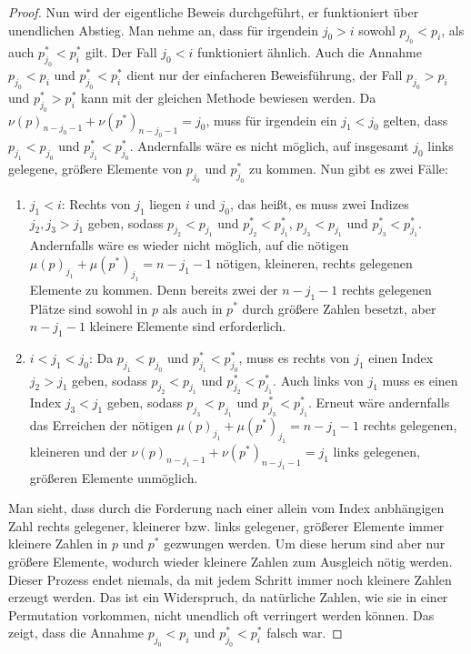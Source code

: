 \documentclass[a4paper, 11pt, ngerman]{article}
\begin{document}
\begin{proof}
    Nun wird der eigentliche Beweis durchgeführt, er funktioniert über unendlichen Abstieg. Man nehme an, dass für irgendein $j_0 > i$ sowohl $p_{j_0} < p_i$, als auch $p^*_{j_0} < p^*_i$ gilt. Der Fall $j_0 < i$ funktioniert ähnlich. Auch die Annahme $p_{j_0} < p_i$ und $p^*_{j_0} < p^*_i$ dient nur der einfacheren Beweisführung, der Fall $p_{j_0} > p_i$ und $p^*_{j_0} > p^*_i$ kann mit der gleichen Methode bewiesen werden. Da $\nu(p)_{n - j_0 - 1} + \nu(p^*)_{n - j_0 - 1} = j_0$, muss für irgendein ein $j_1 < j_0$ gelten, dass $p_{j_1} < p_{j_0}$ und $p^*_{j_1} < p^*_{j_0}$. Andernfalls wäre es nicht möglich, auf insgesamt $j_0$ links gelegene, größere Elemente von $p_{j_0}$ und $p^*_{j_0}$ zu kommen. Nun gibt es zwei Fälle:
    \begin{enumerate}
        \item $j_1 < i$: Rechts von $j_1$ liegen $i$ und $j_0$, das heißt, es muss zwei Indizes $j_2, j_3 > j_1$ geben, sodass $p_{j_2} < p_{j_1}$ und $p^*_{j_2} < p^*_{j_1}$, $p_{j_3} < p_{j_1}$ und $p^*_{j_3} < p^*_{j_1}$. Andernfalls wäre es wieder nicht möglich, auf die nötigen $\mu(p)_{j_1} + \mu(p^*)_{j_1} = n - j_1 - 1$ nötigen, kleineren, rechts gelegenen Elemente zu kommen. Denn bereits zwei der $n - j_1 - 1$ rechts gelegenen Plätze sind sowohl in $p$ als auch in $p^*$ durch größere Zahlen besetzt, aber $n - j_1 - 1$ kleinere Elemente sind erforderlich.
        \item $i < j_1 < j_0$: Da $p_{j_1} < p_{j_0}$ und $p^*_{j_1} < p^*_{j_0}$, muss es rechts von $j_1$ einen Index $j_2 > j_1$ geben, sodass $p_{j_2} < p_{j_1}$ und $p^*_{j_2} < p^*_{j_1}$. Auch links von $j_1$ muss es einen Index $j_3 < j_1$ geben, sodass $p_{j_3} < p_{j_1}$ und $p^*_{j_3} < p^*_{j_1}$. Erneut wäre andernfalls das Erreichen der nötigen $\mu(p)_{j_1} + \mu(p^*)_{j_1} = n - j_1 - 1$ rechts gelegenen, kleineren und der $\nu(p)_{n - j_1 - 1} + \nu(p^*)_{n - j_1 - 1} = j_1$ links gelegenen, größeren Elemente unmöglich.
    \end{enumerate}
    Man sieht, dass durch die Forderung nach einer allein vom Index anbhängigen Zahl rechts gelegener, kleinerer bzw. links gelegener, größerer Elemente immer kleinere Zahlen in $p$ und $p^*$ gezwungen werden. Um diese herum sind aber nur größere Elemente, wodurch wieder kleinere Zahlen zum Ausgleich nötig werden. Dieser Prozess endet niemals, da mit jedem Schritt immer noch kleinere Zahlen erzeugt werden. Das ist ein Widerspruch, da natürliche Zahlen, wie sie in einer Permutation vorkommen, nicht unendlich oft verringert werden können. Das zeigt, dass die Annahme $p_{j_0} < p_i$ und $p^*_{j_0} < p^*_i$ falsch war.
\end{proof}
\end{document}
